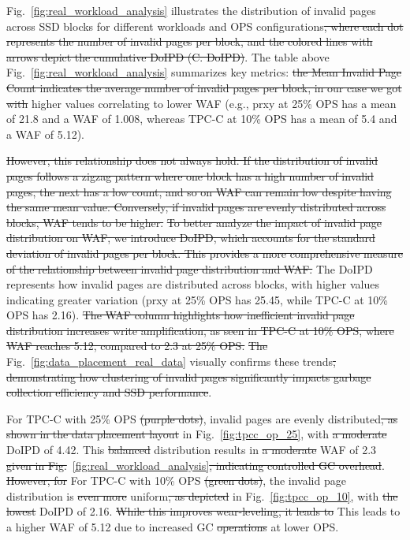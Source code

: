 \documentclass{ieeeaccess}
\begin{document}
Fig.~\ref{fig:real_workload_analysis} illustrates the distribution of invalid pages across SSD blocks for different workloads and OPS configurations\sout{, where each dot represents the number of invalid pages per block, and the colored lines with arrows depict the cumulative DoIPD (C. DoIPD)}.
The table above Fig.~\ref{fig:real_workload_analysis} summarizes key metrics: \sout{the Mean Invalid Page Count indicates the average number of invalid pages per block, in our case we got with} higher values correlating to lower WAF (e.g., prxy at 25\% OPS has a mean of 21.8 and a WAF of 1.008, whereas TPC-C at 10\% OPS has a mean of 5.4 and a WAF of 5.12).

\sout{However, this relationship does not always hold. If the distribution of invalid pages follows a zigzag pattern where one block has a high number of invalid pages, the next has a low count, and so on WAF can remain low despite having the same mean value. Conversely, if invalid pages are evenly distributed across blocks, WAF tends to be higher.}
\sout{To better analyze the impact of invalid page distribution on WAF, we introduce DoIPD, which accounts for the standard deviation of invalid pages per block. This provides a more comprehensive measure of the relationship between invalid page distribution and WAF.}
The DoIPD represents how invalid pages are distributed across blocks, with higher values indicating greater variation (prxy at 25\% OPS has 25.45, while TPC-C at 10\% OPS has 2.16). \sout{The WAF column highlights how inefficient invalid page distribution increases write amplification, as seen in TPC-C at 10\% OPS, where WAF reaches 5.12, compared to 2.3 at 25\% OPS.} \sout{The} Fig.~\ref{fig:data_placement_real_data} visually confirms these trends\sout{, demonstrating how clustering of invalid pages significantly impacts garbage collection efficiency and SSD performance}.

For TPC-C with 25\% OPS \sout{(purple dots)}, invalid pages are evenly distributed\sout{, as shown in the data placement layout} in Fig.~\ref{fig:tpcc_op_25}, with \sout{a moderate} DoIPD of 4.42. This \sout{balanced} distribution results in \sout{a moderate} WAF of 2.3 \sout{given in Fig.}~\ref{fig:real_workload_analysis}\sout{, indicating controlled GC overhead}. \sout{However, for} For TPC-C with 10\% OPS \sout{(green dots)}, the invalid page distribution is \sout{even more} uniform\sout{, as depicted} in Fig.~\ref{fig:tpcc_op_10}, with \sout{the lowest} DoIPD of 2.16. \sout{While this improves wear-leveling, it leads to} This leads to a higher WAF of 5.12 due to increased GC \sout{operations} at lower OPS.
\end{document}

